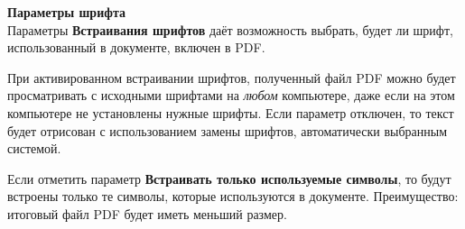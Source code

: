 ﻿\documentclass[a4paper,10pt]{article}
\begin{document}
\begin{itemize}
\textbf{Параметры шрифта}\\
Параметры \textbf{Встраивания шрифтов} даёт возможность выбрать, будет ли шрифт, использованный в документе, включен в PDF.

При активированном встраивании шрифтов, полученный файл PDF можно будет просматривать с исходными шрифтами на \textit{любом} компьютере, даже если на этом компьютере не установлены нужные шрифты. Если параметр отключен, то текст будет отрисован с использованием замены шрифтов, автоматически выбранным системой.

Если отметить параметр \textbf{Встраивать только используемые символы}, то будут встроены только те символы, которые используются в документе. Преимущество: итоговый файл PDF будет иметь меньший размер.
\end{itemize}
\end{document}
